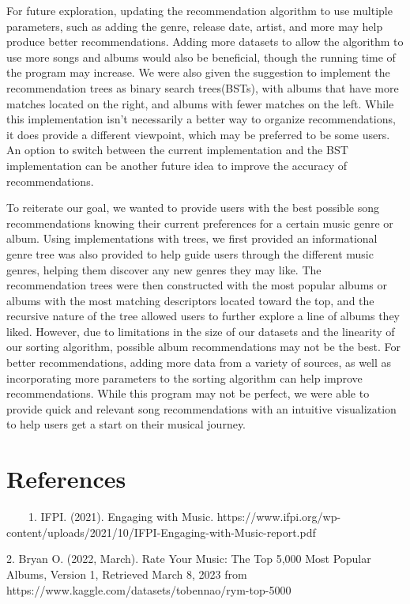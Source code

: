 \documentclass[fontsize=11pt]{article}
\begin{document}
For future exploration, updating the recommendation algorithm to use multiple parameters, such as adding the genre, release date, artist, and more may help produce better recommendations. Adding more datasets to allow the algorithm to use more songs and albums would also be beneficial, though the running time of the program may increase. We were also given the suggestion to implement the recommendation trees as binary search trees(BSTs), with albums that have more matches located on the right, and albums with fewer matches on the left. While this implementation isn't necessarily a better way to organize recommendations, it does provide a different viewpoint, which may be preferred to be some users. An option to switch between the current implementation and the BST implementation can be another future idea to improve the accuracy of recommendations. \newline

To reiterate our goal, we wanted to provide users with the best possible song recommendations knowing their current preferences for a certain music genre or album. Using implementations with trees, we first provided an informational genre tree was also provided to help guide users through the different music genres, helping them discover any new genres they may like. The recommendation trees were then constructed with the most popular albums or albums with the most matching descriptors located toward the top, and the recursive nature of the tree allowed users to further explore a line of albums they liked. However, due to limitations in the size of our datasets and the linearity of our sorting algorithm, possible album recommendations may not be the best. For better recommendations, adding more data from a variety of sources, as well as incorporating more parameters to the sorting algorithm can help improve recommendations. While this program may not be perfect, we were able to provide quick and relevant song recommendations with an intuitive visualization to help users get a start on their musical journey.

\section*{References}  
~~~~1. IFPI. (2021). Engaging with Music. https://www.ifpi.org/wp-content/uploads/2021/10/IFPI-Engaging-with-Music-report.pdf \newline  
  
2. Bryan O. (2022, March). Rate Your Music: The Top 5,000 Most Popular Albums, Version 1, Retrieved March 8, 2023 from https://www.kaggle.com/datasets/tobennao/rym-top-5000 \newline  
\end{document}
